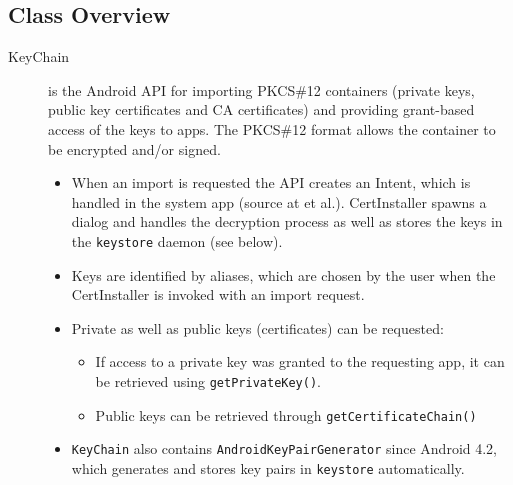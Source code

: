 \documentclass[a4paper,draft]{scrartcl}
\begin{document}
	\subsection{Class Overview}
		\begin{description}
			\item[KeyChain] is the Android API for importing PKCS\#12 containers (private keys, public key certificates and CA certificates) and providing grant-based access of the keys to apps. The PKCS\#12 format allows the container to be encrypted and/or signed.
				\begin{itemize}
					\item When an import is requested the API creates an Intent, which is handled in the system app  (source at  et al.). CertInstaller spawns a dialog and handles the decryption process as well as stores the keys in the \texttt{keystore} daemon (see below).
					\item Keys are identified by aliases, which are chosen by the user when the CertInstaller is invoked with an import request.
					\item Private as well as public keys (certificates) can be requested:
					\begin{itemize}
						\item If access to a private key was granted to the requesting app, it can be retrieved using \texttt{getPrivateKey()}.
						\item Public keys can be retrieved through \texttt{getCertificateChain()}
					\end{itemize}
				\item \texttt{KeyChain} also contains \texttt{AndroidKeyPairGenerator} since Android 4.2, which generates and stores key pairs in \texttt{key\-store} automatically.
				\end{itemize}


\end{description}
\end{document}
